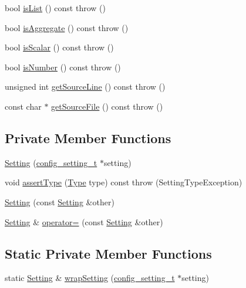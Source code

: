 \begin{DoxyCompactItemize}
bool \hyperlink{classlibconfig_1_1Setting_aa87c4f6efac4dbe6113acf5b5c52a9a6}{is\-List} () const   throw ()
\item 
bool \hyperlink{classlibconfig_1_1Setting_a54e002cdff43b3d86abf8ee8aec46d9c}{is\-Aggregate} () const   throw ()
\item 
bool \hyperlink{classlibconfig_1_1Setting_ad54ec1ccdfa33295b5d665ca93544c87}{is\-Scalar} () const   throw ()
\item 
bool \hyperlink{classlibconfig_1_1Setting_af9fdefc564d0cc82ddc1052c2afab6af}{is\-Number} () const   throw ()
\item 
unsigned int \hyperlink{classlibconfig_1_1Setting_af789d129c32aa5119afb13a43cbad3c0}{get\-Source\-Line} () const   throw ()
\item 
const char $\ast$ \hyperlink{classlibconfig_1_1Setting_ad7dee0de27baf79df645ef0fa499f2f7}{get\-Source\-File} () const   throw ()
\end{DoxyCompactItemize}
\subsection*{Private Member Functions}
\begin{DoxyCompactItemize}
\item 
\hyperlink{classlibconfig_1_1Setting_ae275c0205ed72f9976dca1a5e853de8b}{Setting} (\hyperlink{structconfig__setting__t}{config\-\_\-setting\-\_\-t} $\ast$setting)
\item 
void \hyperlink{classlibconfig_1_1Setting_a07507216298487ce69cf77f56a77df41}{assert\-Type} (\hyperlink{classlibconfig_1_1Setting_a42f760ff88654e784477a6f040267bb4}{Type} type) const   throw (\-Setting\-Type\-Exception)
\item 
\hyperlink{classlibconfig_1_1Setting_acc5d1366bf36f09aad97d77138d7e50e}{Setting} (const \hyperlink{classlibconfig_1_1Setting}{Setting} \&other)
\item 
\hyperlink{classlibconfig_1_1Setting}{Setting} \& \hyperlink{classlibconfig_1_1Setting_a67cc9b10982902a57acea7b54e2f9762}{operator=} (const \hyperlink{classlibconfig_1_1Setting}{Setting} \&other)
\end{DoxyCompactItemize}
\subsection*{Static Private Member Functions}
\begin{DoxyCompactItemize}
\item 
static \hyperlink{classlibconfig_1_1Setting}{Setting} \& \hyperlink{classlibconfig_1_1Setting_a0299158e1023f4a993708d09aec64c68}{wrap\-Setting} (\hyperlink{structconfig__setting__t}{config\-\_\-setting\-\_\-t} $\ast$setting)
\end{DoxyCompactItemize}

